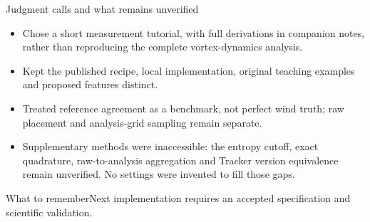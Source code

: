\documentclass[aspectratio=169,11pt]{beamer}
\newcommand{\prov}{}
\newcommand{\evidence}[1]{\gdef\prov{#1}}
\newcommand{\takeaway}[1]{\vspace{0.3em}\begin{block}{What to remember}#1\end{block}}
\begin{document}
\evidence{Judgment calls, access limits and unresolved alternatives.}
\begin{frame}{Judgment calls and what remains unverified}
 \begin{itemize}
  \item Chose a short measurement tutorial, with full derivations in companion
  notes, rather than reproducing the complete vortex-dynamics analysis.
  \item Kept the published recipe, local implementation, original teaching
  examples and proposed features distinct.
  \item Treated reference agreement as a benchmark, not perfect wind truth;
  raw placement and analysis-grid sampling remain separate.
  \item Supplementary methods were inaccessible: the entropy cutoff, exact
  quadrature, raw-to-analysis aggregation and Tracker version equivalence
  remain unverified. No settings were invented to fill those gaps.
 \end{itemize}
 \takeaway{Next implementation requires an accepted specification and scientific validation.}
\end{frame}
\end{document}

